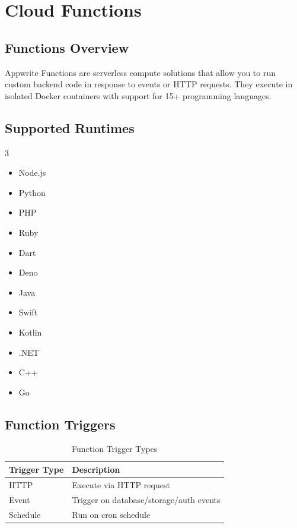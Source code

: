 \documentclass[11pt,a4paper,oneside]{book}
\begin{document}
\chapter{Cloud Functions}

\section{Functions Overview}

\begin{definitionbox}
Appwrite Functions are serverless compute solutions that allow you to run custom backend code in response to events or HTTP requests. They execute in isolated Docker containers with support for 15+ programming languages.
\end{definitionbox}

\section{Supported Runtimes}

\begin{multicols}{3}
\begin{itemize}
    \item Node.js
    \item Python
    \item PHP
    \item Ruby
    \item Dart
    \item Deno
    \item Java
    \item Swift
    \item Kotlin
    \item .NET
    \item C++
    \item Go
\end{itemize}
\end{multicols}

\section{Function Triggers}

\begin{table}[h]
\centering
\begin{tabularx}{\textwidth}{l X}
\toprule
\textbf{Trigger Type} & \textbf{Description} \\
\midrule
HTTP & Execute via HTTP request \\
Event & Trigger on database/storage/auth events \\
Schedule & Run on cron schedule \\
\bottomrule
\end{tabularx}
\caption{Function Trigger Types}
\end{table}
\end{document}
